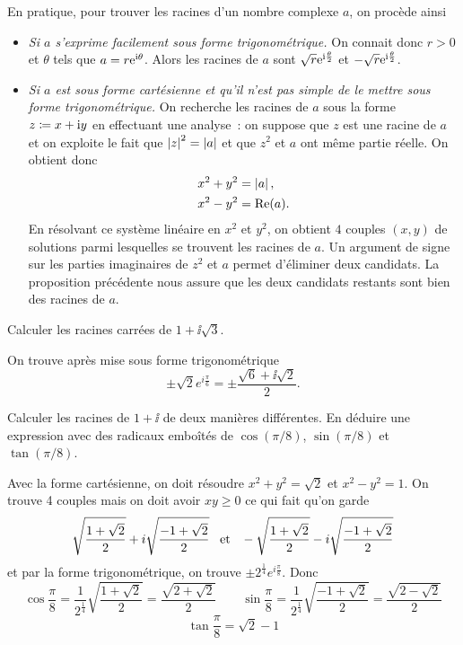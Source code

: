 \documentclass{magnoliaold}
\begin{document}
\begin{remarqueUnique}
\remarque En pratique, pour trouver les racines d'un nombre complexe $a$, on procède ainsi
  \begin{itemize}
    \item {\it Si $a$ s'exprime facilement sous forme trigonométrique.}
      On connait donc $r>0$ et $\theta$ tels que $a=r{\rm e}^{{\rm i}\theta}$. Alors
      les racines de $a$ sont $\sqrt{r}{\rm e}^{{\rm i}\frac{\theta}{2}}$
      et $-\sqrt{r}{\rm e}^{{\rm i}\frac{\theta}{2}}$.
    \item {\it Si $a$ est sous forme cartésienne et qu'il n'est pas
      simple de le mettre sous forme trigonométrique.}
      On recherche les racines de $a$ sous la forme $z\coloneqq x+{\rm i} y$ en
      effectuant une analyse~: on suppose que $z$ est une racine de $a$
      et on exploite le fait que $\left|z\right|^2=\left|a\right|$ et que $z^2$ et $a$
      ont même partie réelle. On obtient donc
      \begin{align*}
        x^2+y^2&=\left|a\right|,\\
        x^2-y^2&=\mathop{\rm Re}(a).
      \end{align*}
      En résolvant ce système linéaire en $x^2$ et $y^2$, on obtient $4$
      couples $(x,y)$ de solutions parmi lesquelles se trouvent les racines de 
      $a$. Un argument de signe sur les parties imaginaires de $z^2$ et
      $a$ permet d'éliminer deux candidats. La proposition précédente
      nous assure que les deux candidats restants sont bien des racines de
      $a$.
  \end{itemize}
\end{remarqueUnique}

\begin{exos}
\exo Calculer les racines carrées de $1+\ii\sqrt{3}$.
  \begin{sol}
  On trouve après mise sous forme trigonométrique
  \[\pm\sqrt{2}e^{i\frac{\pi}{6}}=\pm\frac{\sqrt{6}+\ii\sqrt{2}}{2}.\]
  \end{sol}
\exo Calculer les racines de $1+\ii$ de deux manières différentes.
  En déduire une expression avec des radicaux emboîtés de
  $\cos(\pi/8)$, $\sin(\pi/8)$ et $\tan(\pi/8)$.
  \begin{sol}
  Avec la forme cartésienne, on doit résoudre $x^2+y^2=\sqrt{2}$ et $x^2-y^2=1$. On trouve 4 couples mais on doit avoir $xy\geq 0$ ce qui fait qu'on garde 
  \[\sqrt{\frac{1+\sqrt{2}}{2}}+i\sqrt{\frac{-1+\sqrt{2}}{2}} \quad\!\text{et}\quad\!
    -\sqrt{\frac{1+\sqrt{2}}{2}}-i\sqrt{\frac{-1+\sqrt{2}}{2}}\]
  et par la forme trigonométrique, on trouve $\pm 2^{\frac{1}{4}}e^{i\frac{\pi}{8}}$. Donc
  \[\cos\frac{\pi}{8}=\frac{1}{2^{\frac{1}{4}}}\sqrt{\frac{1+\sqrt{2}}{2}}=
    \frac{\sqrt{2+\sqrt{2}}}{2} \qquad
    \sin\frac{\pi}{8}=\frac{1}{2^{\frac{1}{4}}}\sqrt{\frac{-1+\sqrt{2}}{2}}=
    \frac{\sqrt{2-\sqrt{2}}}{2}\]
  \[\tan\frac{\pi}{8}=\sqrt{2}-1\]
  \end{sol}
\end{exos}
\end{document}
